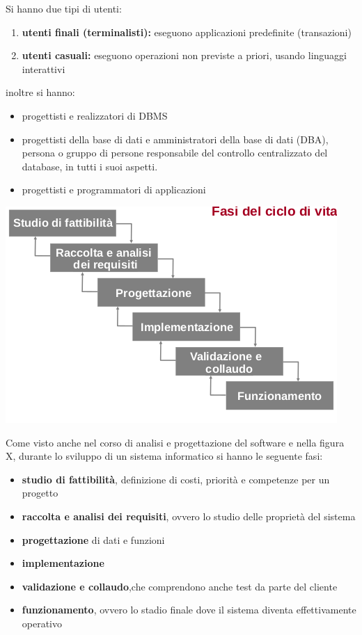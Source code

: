 \documentclass[a4paper,12pt, oneside]{book}
\begin{document}
Si hanno due tipi di utenti:
\begin{enumerate}
    \item \textbf{utenti finali (terminalisti):} eseguono applicazioni predefinite (transazioni)
    \item \textbf{utenti casuali:} eseguono operazioni non previste a priori, usando linguaggi interattivi
\end{enumerate}
inoltre si hanno:
\begin{itemize}
    \item progettisti e realizzatori di DBMS
    \item progettisti della base di dati e amministratori della base di dati (DBA), 
          persona o gruppo di persone responsabile del controllo centralizzato del database,
          in tutti i suoi aspetti.
    \item progettisti e programmatori di applicazioni
\end{itemize}
\begin{center}
\includegraphics[scale=0.8]{img/bas.png}
\end{center}
Come visto anche nel corso di analisi e progettazione del software e nella figura X,
durante lo sviluppo di un sistema informatico si hanno le seguente fasi:
\begin{itemize}
    \item \textbf{studio di fattibilità}, definizione di costi, priorità e competenze per un progetto
    \item\textbf{raccolta e analisi dei requisiti}, ovvero lo studio delle proprietà del sistema
    \item \textbf{progettazione} di dati e funzioni
    \item \textbf{implementazione}
    \item \textbf{validazione e collaudo},che comprendono anche test da parte del cliente
    \item \textbf{funzionamento}, ovvero lo stadio finale dove il sistema diventa effettivamente operativo
\end{itemize}
\end{document}
